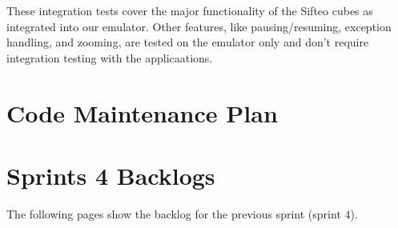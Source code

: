\documentclass[12pt]{article}
\begin{document}
These integration tests cover the major functionality of the Sifteo cubes as integrated into our emulator. Other features, like pausing/resuming, exception handling, and zooming, are tested on the emulator only and don't require integration testing with the applicaations.

\section*{Code Maintenance Plan}

\section*{Sprints 4 Backlogs}
The following pages show the backlog for the previous sprint (sprint 4). \\


        
\end{document}
